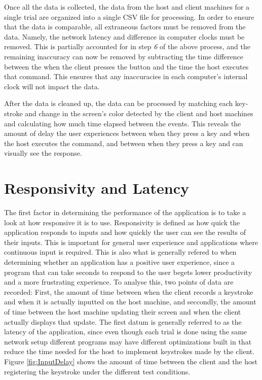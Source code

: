 \noindent
Once all the data is collected, the data from the host and client machines for a single trial are organized into a single CSV file for processing.
In order to ensure that the data is comparable, all extraneous factors must be removed from the data.
Namely, the network latency and difference in computer clocks must be removed.
This is partially accounted for in step \emph{6} of the above process, and the remaining inaccuracy can now be removed by subtracting the time difference between the when the client presses the button and the time the host executes that command.
This ensures that any inaccuracies in each computer's internal clock will not impact the data.

After the data is cleaned up, the data can be processed by matching each key-stroke and change in the screen's color detected by the client and host machines and calculating how much time elapsed between the events.
This reveals the amount of delay the user experiences between when they press a key and when the host executes the command, and between when they press a key and can visually see the response.


\section{Responsivity and Latency}

The first factor in determining the performance of the application is to take a look at how responsive it is to use.
Responsivity is defined as how quick the application responds to inputs and how quickly the user can see the results of their inputs.
This is important for general user experience and applications where continuous input is required.
This is also what is generally refered to when determining whether an application has a positive user experience, since a program that can take seconds to respond to the user begets lower productivity and a more frustrating experience.
To analyse this, two points of data are recorded: First, the amount of time between when the client records a keystroke and when it is actually inputted on the host machine, and seccondly, the amount of time between the host machine updating their screen and when the client actually displays that update.
The first datum is generally referred to as the latency of the application, since even though each trial is done using the same network setup different programs may have different optimizations built in that reduce the time needed for the host to implement keystrokes made by the client.
Figure \ref{fig:InputDelay} shows the amount of time between the client and the host registering the keystroke under the different test conditions.

